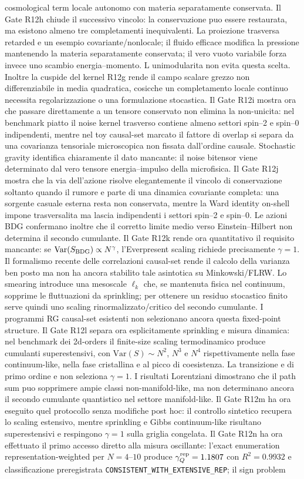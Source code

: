 \documentclass[11pt,a4paper]{article}
\begin{document}
cosmological term locale autonomo con materia separatamente conservata. Il Gate R12h chiude il successivo vincolo: la conservazione puo essere restaurata, ma esistono almeno tre completamenti inequivalenti. La proiezione trasversa retarded e un esempio covariante/nonlocale; il fluido efficace modifica la pressione mantenendo la materia separatamente conservata; il vero vuoto variabile forza invece uno scambio energia--momento. L unimodularita non evita questa scelta. Inoltre la cuspide del kernel R12g rende il campo scalare grezzo non differenziabile in media quadratica, cosicche un completamento locale continuo necessita regolarizzazione o una formulazione stocastica. Il Gate R12i mostra ora che passare direttamente a un tensore conservato non elimina la non-unicita: nel benchmark piatto il noise kernel trasverso contiene almeno settori spin--2 e spin--0 indipendenti, mentre nel toy causal-set marcato il fattore di overlap si separa da una covarianza tensoriale microscopica non fissata dall'ordine causale. Stochastic gravity identifica chiaramente il dato mancante: il noise bitensor viene determinato dal vero tensore energia--impulso della microfisica. Il Gate R12j mostra che la via dell'azione risolve elegantemente il vincolo di conservazione soltanto quando il rumore e parte di una dinamica covariante completa: una sorgente casuale esterna resta non conservata, mentre la Ward identity on-shell impone trasversalita ma lascia indipendenti i settori spin--2 e spin--0. Le azioni BDG confermano inoltre che il corretto limite medio verso Einstein--Hilbert non determina il secondo cumulante. Il Gate R12k rende ora quantitativo il requisito mancante: se $\mathrm{Var}(S_{\rm BDG})\propto N^\gamma$, l'Everpresent scaling richiede precisamente $\gamma=1$. Il formalismo recente delle correlazioni causal-set rende il calcolo della varianza ben posto ma non ha ancora stabilito tale asintotica su Minkowski/FLRW. Lo smearing introduce una mesoscale $\ell_k$ che, se mantenuta fisica nel continuum, sopprime le fluttuazioni da sprinkling; per ottenere un residuo stocastico finito serve quindi uno scaling rinormalizzato/critico del secondo cumulante. I programmi RG causal-set esistenti non selezionano ancora questa fixed-point structure. Il Gate R12l separa ora esplicitamente sprinkling e misura dinamica: nel benchmark dei 2d-orders il finite-size scaling termodinamico produce cumulanti superestensivi, con $\mathrm{Var}(S)\sim N^2$, $N^3$ e $N^4$ rispettivamente nella fase continuum-like, nella fase cristallina e al picco di coesistenza. La transizione e di primo ordine e non seleziona $\gamma=1$. I risultati Lorentziani dimostrano che il path sum puo sopprimere ampie classi non-manifold-like, ma non determinano ancora il secondo cumulante quantistico nel settore manifold-like. Il Gate R12m ha ora eseguito quel protocollo senza modifiche post hoc: il controllo sintetico recupera lo scaling estensivo, mentre sprinkling e Gibbs continuum-like risultano superestensivi e respingono $\gamma=1$ sulla griglia congelata. Il Gate R12n ha ora effettuato il primo accesso diretto alla misura oscillante: l'exact enumeration representation-weighted per $N=4$--$10$ produce $\gamma_Q^{\rm rep}=1.1807$ con $R^2=0.9932$ e classificazione preregistrata \texttt{CONSISTENT\_WITH\_EXTENSIVE\_REP}; il sign problem 
\end{document}
